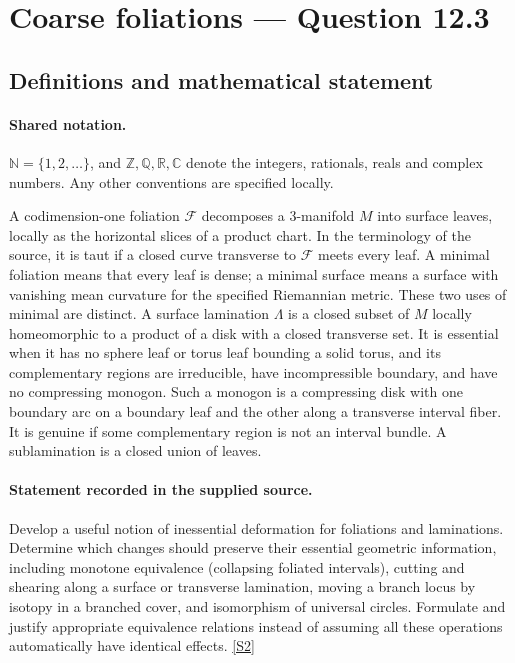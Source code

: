 \documentclass[11pt]{article}
\newcommand{\sref}[2]{\hyperlink{source:#1:#2}{[S#2]}}
\begin{document}
\section{Coarse foliations — Question 12.3}\label{statement}

\subsection{Definitions and mathematical statement}

\paragraph{Shared notation.}$\mathbb N=\{1,2,\ldots\}$, and $\mathbb Z,\mathbb Q,\mathbb R,\mathbb C$ denote the integers, rationals, reals and complex numbers. Any other conventions are specified locally.


A codimension-one foliation $\mathcal F$ decomposes a $3$-manifold $M$ into surface leaves, locally as the horizontal slices of a product chart. In the terminology of the source, it is taut if a closed curve transverse to $\mathcal F$ meets every leaf. A minimal foliation means that every leaf is dense; a minimal surface means a surface with vanishing mean curvature for the specified Riemannian metric. These two uses of minimal are distinct. A surface lamination $\Lambda$ is a closed subset of $M$ locally homeomorphic to a product of a disk with a closed transverse set. It is essential when it has no sphere leaf or torus leaf bounding a solid torus, and its complementary regions are irreducible, have incompressible boundary, and have no compressing monogon. Such a monogon is a compressing disk with one boundary arc on a boundary leaf and the other along a transverse interval fiber. It is genuine if some complementary region is not an interval bundle. A sublamination is a closed union of leaves.
\paragraph{Statement recorded in the supplied source.}
Develop a useful notion of inessential deformation for foliations and laminations. Determine which changes should preserve their essential geometric information, including monotone equivalence (collapsing foliated intervals), cutting and shearing along a surface or transverse lamination, moving a branch locus by isotopy in a branched cover, and isomorphism of universal circles. Formulate and justify appropriate equivalence relations instead of assuming all these operations automatically have identical effects. \sref{statement}{2}
\end{document}
